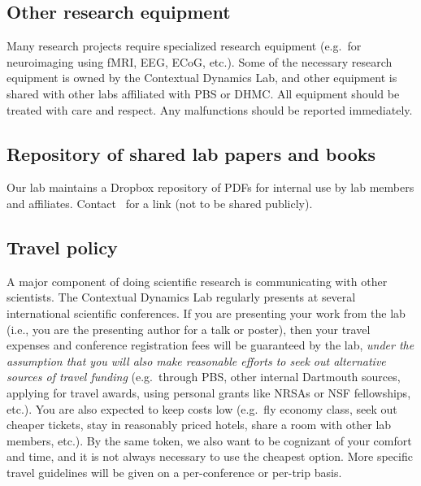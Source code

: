 \documentclass{tufte-book} %
\begin{document}
 \subsection{Other research equipment}
 Many research projects require specialized research equipment (e.g.\
 for neuroimaging using fMRI, EEG, ECoG, etc.).  Some of the necessary
 research equipment is owned by the Contextual Dynamics Lab, and other
 equipment is shared with other labs affiliated with PBS or DHMC.  All
 equipment should be treated with care and respect.  Any malfunctions
 should be reported immediately.

\subsection{Repository of shared lab papers and books}
Our lab maintains a Dropbox repository of PDFs for internal use by lab
members and affiliates. Contact \director~for a link (not to be shared
publicly).

 \subsection{Travel policy}
 A major component of doing scientific
 research is communicating with other scientists.  The Contextual
 Dynamics Lab regularly presents at several international scientific
 conferences.  If you are presenting your work from the lab (i.e., you
 are the presenting author for a talk or poster), then your travel
 expenses and conference registration fees will be guaranteed by the
 lab, \textit{under the assumption that you will also make reasonable
   efforts to seek out alternative sources of travel funding} (e.g.\
 through PBS, other internal Dartmouth sources, applying for travel
 awards, using personal grants like NRSAs or NSF fellowships, etc.).
 You are also expected to keep costs low (e.g.\ fly economy class,
 seek out cheaper tickets, stay in reasonably priced hotels, share a
 room with other lab members, etc.).  By the same token, we also want
 to be cognizant of your comfort and time, and it is not always
 necessary to use the cheapest option.  More specific travel
 guidelines will be given on a per-conference or per-trip basis.
\end{document}
